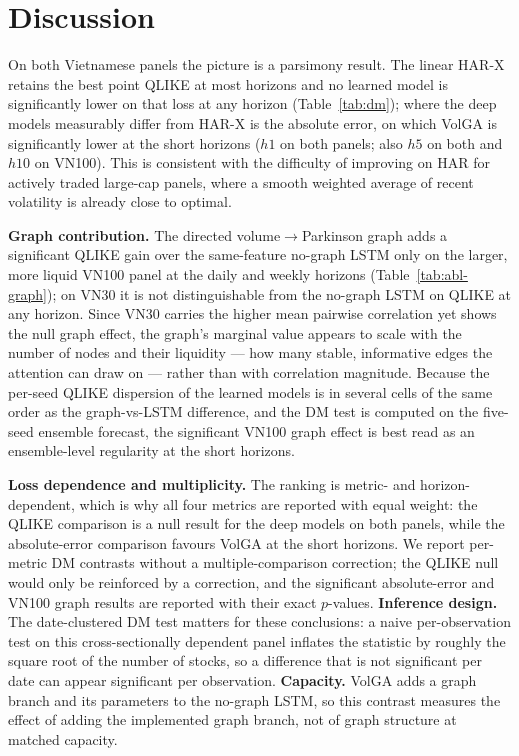 \documentclass[runningheads]{llncs}
\begin{document}
\FloatBarrier
\section{Discussion}\label{sec:disc}
On both Vietnamese panels the picture is a parsimony result. The linear HAR-X retains the best point
QLIKE at most horizons and no learned model is significantly lower on that loss at any horizon
(Table~\ref{tab:dm}); where the deep models measurably differ from HAR-X is the absolute error, on
which VolGA is significantly lower at the short horizons ($h1$ on both panels; also $h5$ on both and
$h10$ on VN100). This is consistent with the difficulty of improving on HAR for actively traded
large-cap panels, where a smooth weighted average of recent volatility is already close to optimal.

\textbf{Graph contribution.} The directed volume$\to$Parkinson graph adds a significant QLIKE gain
over the same-feature no-graph LSTM only on the larger, more liquid VN100 panel at the daily and
weekly horizons (Table~\ref{tab:abl-graph}); on VN30 it is not distinguishable from the no-graph LSTM
on QLIKE at any horizon. Since VN30 carries the higher mean pairwise correlation yet shows the null
graph effect, the graph's marginal value appears to scale with the number of nodes and their
liquidity --- how many stable, informative edges the attention can draw on --- rather than with
correlation magnitude. Because the per-seed QLIKE dispersion of the learned models is in several
cells of the same order as the graph-vs-LSTM difference, and the DM test is computed on the five-seed
ensemble forecast, the significant VN100 graph effect is best read as an ensemble-level regularity at
the short horizons.

\textbf{Loss dependence and multiplicity.} The ranking is metric- and horizon-dependent, which is why
all four metrics are reported with equal weight: the QLIKE comparison is a null result for the deep
models on both panels, while the absolute-error comparison favours VolGA at the short horizons. We
report per-metric DM contrasts without a multiple-comparison correction; the QLIKE null would only be
reinforced by a correction, and the significant absolute-error and VN100 graph results are reported
with their exact $p$-values. \textbf{Inference design.} The date-clustered DM test matters for these
conclusions: a naive per-observation test on this cross-sectionally dependent panel inflates the
statistic by roughly the square root of the number of stocks, so a difference that is not significant
per date can appear significant per observation. \textbf{Capacity.} VolGA adds a graph branch and its
parameters to the no-graph LSTM, so this contrast measures the effect of adding the implemented graph
branch, not of graph structure at matched capacity.
\end{document}
